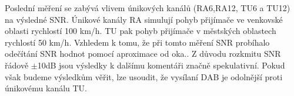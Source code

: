 \documentclass[10pt, a4paper]{article}%
\begin{document}
\clearpage
Poslední měření se zabývá vlivem únikových kanálů (RA6,RA12, TU6 a TU12) na výsledné SNR. Únikové kanály RA simulují pohyb přijímače ve venkovské
oblasti rychlostí 100 km/h. TU pak pohyb přijímače v městských oblastech rychlostí 50 km/h. Vzhledem k tomu, že při tomto měření SNR
probíhalo odečítání SNR hodnot pomocí aproximace od oka.. Z důvodu rozkmitu SNR řádově $\pm$10dB jsou výsledky k dalšímu komentáři značně
spekulativní. Pokud však budeme výsledkům věřit, lze usoudit, že vysílaní DAB je odolnější proti únikovému kanálu TU.
\begin{table}[ht!]
    \begin{minipage}{0.5\textwidth}
\end{minipage}
\end{table}
\end{document}
